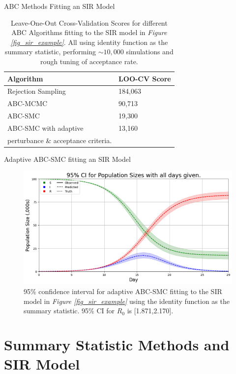 \documentclass[aspectratio=169]{beamer}
\begin{document}
\begin{frame}{ABC Methods Fitting an SIR Model}
  \begin{table}
    \begin{tabular}{|l|l|}
      \hline
      \textbf{Algorithm}&\textbf{LOO-CV Score}\\
      \hline \hline
      Rejection Sampling&184,063\\\hline
      ABC-MCMC&90,713\\\hline
      ABC-SMC&19,300\\\hline
      ABC-SMC with adaptive&13,160\\perturbance \& acceptance criteria.&\\\hline
    \end{tabular}
    \caption{Leave-One-Out Cross-Validation Scores for different ABC Algorithms fitting to the SIR model in \textit{Figure \ref{fig_sir_example}}. All using identity function as the summary statistic, performing $\sim10,000$ simulations and rough tuning of acceptance rate.}
  \end{table}
\end{frame}

\begin{frame}{Adaptive ABC-SMC fitting an SIR Model}
  \begin{figure}[H]
    \centering
    \includegraphics[width=.75\textwidth]{ABC_SMC_SIR_CI.png}
    \caption{95\% confidence interval for adaptive ABC-SMC fitting to the SIR model in \textit{Figure \ref{fig_sir_example}} using the identity function as the summary statistic. 95\% CI for $R_0$ is [1.871,2.170].}
  \end{figure}
\end{frame}

\section{Summary Statistic Methods and SIR Model}
\end{document}
